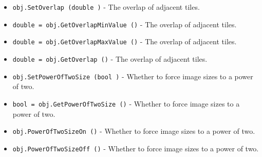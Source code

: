 \begin{itemize}
\item  \verb|obj.SetOverlap (double )| -  The overlap of adjacent tiles.

\item  \verb|double = obj.GetOverlapMinValue ()| -  The overlap of adjacent tiles.

\item  \verb|double = obj.GetOverlapMaxValue ()| -  The overlap of adjacent tiles.

\item  \verb|double = obj.GetOverlap ()| -  The overlap of adjacent tiles.

\item  \verb|obj.SetPowerOfTwoSize (bool )| -  Whether to force image sizes to a power of two.

\item  \verb|bool = obj.GetPowerOfTwoSize ()| -  Whether to force image sizes to a power of two.

\item  \verb|obj.PowerOfTwoSizeOn ()| -  Whether to force image sizes to a power of two.

\item  \verb|obj.PowerOfTwoSizeOff ()| -  Whether to force image sizes to a power of two.

\end{itemize}
